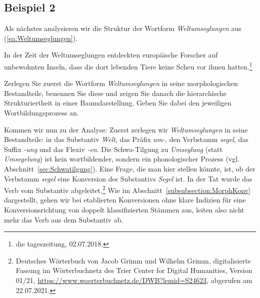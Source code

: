 \subsection{Beispiel 2}\label{subsection:Bsp2Wb}

Als nächstes analysieren wir die Struktur der Wortform \textit{Weltumseglungen} aus (\ref{ea:Weltumseglungen}).

\ea \label{ea:Weltumseglungen} In der Zeit der Weltumseglungen entdeckten europäische Forscher auf unbewohnten Inseln, dass die dort lebenden Tiere keine Scheu vor ihnen hatten.\footnote{die tageszeitung, 02.07.2018.}
\z 

Zerlegen Sie zuerst die Wortform \textit{Weltumseglungen} in seine morphologischen Bestandteile, benennen Sie diese und zeigen Sie danach die hierarchische Strukturiertheit in einer Baumdarstellung. Geben Sie dabei den jeweiligen Wortbildungsprozess an.


Kommen wir nun zu der Analyse: Zuerst zerlegen wir \textit{Weltumseglungen} in seine Bestandteile: in das Substantiv \textit{Welt}, das Präfix \textit{um-}, den Verbstamm \textit{segel}, das Suffix \textit{-ung} und das Flexiv \textit{-en}. Die Schwa-Tilgung zu \textit{Umseglung} (statt \textit{Umsegelung}) ist kein wortbildender, sondern ein phonologischer Prozess (vgl. Abschnitt~\ref{sec:Schwatilgung}). Eine Frage, die man hier stellen könnte, ist, ob der Verbstamm \textit{segel} eine Konversion des Substantivs \textit{Segel} ist. In der Tat wurde das Verb vom Substantiv abgeleitet.\footnote{Deutsches Wörterbuch von Jacob Grimm und Wilhelm Grimm, digitalisierte Fassung im Wörterbuchnetz des Trier Center for Digital Humanities, Version 01/21, \url{https://www.woerterbuchnetz.de/DWB?lemid=S24623}, abgerufen am 22.07.2021.} Wie im Abschnitt~\ref{subsubsection:MorphKonv} dargestellt, gehen wir bei etablierten Konversionen ohne klare Indizien für eine Konversionsrichtung von doppelt klassifizierten Stämmen aus, leiten also nicht mehr das Verb aus dem Substantiv ab.


